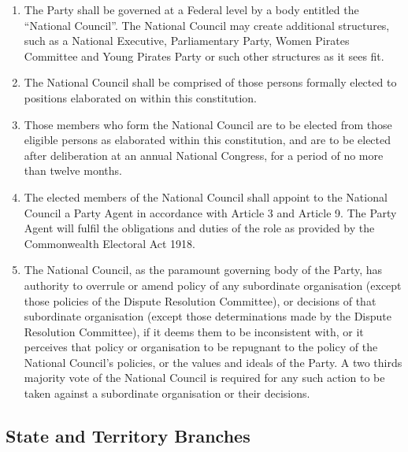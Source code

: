 \documentclass[a4paper,titlepage,8.5pt]{article}
\begin{document}
\begin{enumerate}
\item The Party shall be governed at a Federal level by a body entitled the ``National Council''. The National Council may create additional structures, such as a National Executive, Parliamentary Party, Women Pirates Committee and Young Pirates Party or such other structures as it sees fit.
\item The National Council shall be comprised of those persons formally elected to positions elaborated on within this constitution.
\item Those members who form the National Council are to be elected from those eligible persons as elaborated within this constitution, and are to be elected after deliberation at an annual National Congress, for a period of no more than twelve months.
\item The elected members of the National Council shall appoint to the National Council a Party Agent in accordance with Article 3 and Article 9. The Party Agent will fulfil the obligations and duties of the role as provided by the Commonwealth Electoral Act 1918.
\item The National Council, as the paramount governing body of the Party, has authority to overrule or amend policy of any subordinate organisation (except those policies of the Dispute Resolution Committee), or decisions of that subordinate organisation (except those determinations made by the Dispute Resolution Committee), if it deems them to be inconsistent with, or it perceives that policy or organisation to be repugnant to the policy of the National Council’s policies, or the values and ideals of the Party. A two thirds majority vote of the National Council is required for any such action to be taken against a subordinate organisation or their decisions.
\end{enumerate}

\subsection{State and Territory Branches}
\end{document}
